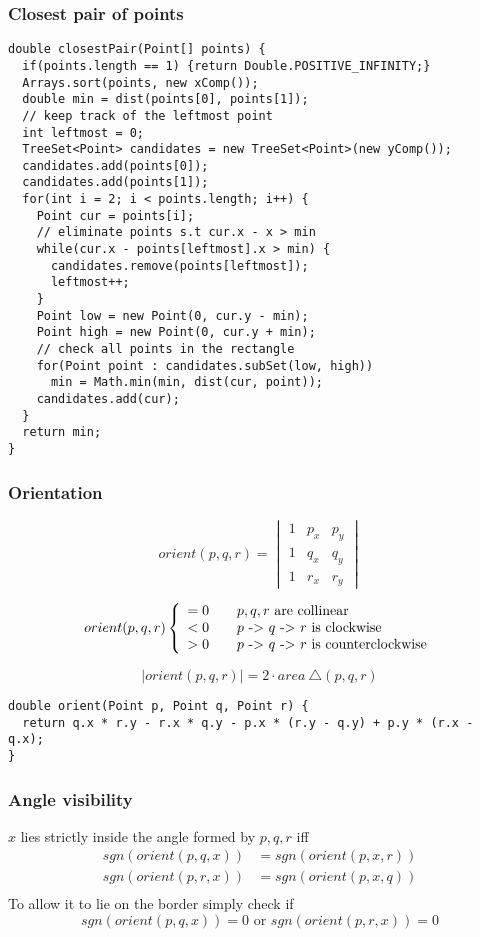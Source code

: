 \subsubsection{Closest pair of points}
\begin{lstlisting}
double closestPair(Point[] points) {
  if(points.length == 1) {return Double.POSITIVE_INFINITY;}
  Arrays.sort(points, new xComp());
  double min = dist(points[0], points[1]);
  // keep track of the leftmost point
  int leftmost = 0;
  TreeSet<Point> candidates = new TreeSet<Point>(new yComp());
  candidates.add(points[0]);
  candidates.add(points[1]);
  for(int i = 2; i < points.length; i++) {
    Point cur = points[i];
    // eliminate points s.t cur.x - x > min 
    while(cur.x - points[leftmost].x > min) {
      candidates.remove(points[leftmost]);
      leftmost++;
    }
    Point low = new Point(0, cur.y - min);
    Point high = new Point(0, cur.y + min);
    // check all points in the rectangle
    for(Point point : candidates.subSet(low, high))
      min = Math.min(min, dist(cur, point));
    candidates.add(cur);
  }
  return min;
}
\end{lstlisting}

\subsubsection{Orientation}
$$
orient(p, q, r) = 
\begin{vmatrix}
1 & p_x & p_y \\
1 & q_x & q_y \\
1 & r_x & r_y
\end{vmatrix}
$$

$$
orient(p, q, r) \left\{
\begin{array}{l l l}
= 0 \quad & \text{$p, q, r$ are collinear} \\
< 0 \quad & \text{$p$ -> $q$ -> $r$ is clockwise} \\
> 0 \quad & \text{$p$ -> $q$ -> $r$ is counterclockwise}
\end{array} \right.
$$

$$
|orient(p, q, r)| = 2 \cdot area \ \triangle(p, q, r)
$$

\begin{lstlisting}
double orient(Point p, Point q, Point r) {
  return q.x * r.y - r.x * q.y - p.x * (r.y - q.y) + p.y * (r.x - q.x);
}
\end{lstlisting}

\subsubsection{Angle visibility}
$x$ lies strictly inside the angle formed by $p, q, r$ iff
\begin{align*}
sgn(orient(p, q, x)) & = sgn(orient(p, x, r)) \\
sgn(orient(p, r, x)) & = sgn(orient(p, x, q)) \\
\end{align*}
To allow it to lie on the border simply check if $$sgn(orient(p, q, x)) = 0 \text{ or } sgn(orient(p, r, x)) = 0$$

